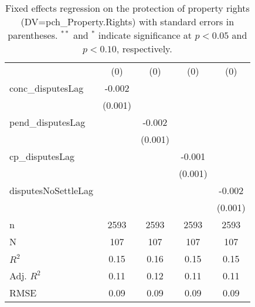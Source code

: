 \begin{table}[ht]
\begin{tabular}{lcccc}
   & (0) & (0) & (0) & (0) \\ 
  conc\_disputesLag & -0.002 &  &  &  \\ 
   & (0.001) &  &  &  \\ 
  pend\_disputesLag &  & -0.002 &  &  \\ 
   &  & (0.001) &  &  \\ 
  cp\_disputesLag &  &  & -0.001 &  \\ 
   &  &  & (0.001) &  \\ 
  disputesNoSettleLag &  &  &  & -0.002 \\ 
   &  &  &  & (0.001) \\ 
   \hline
n & 2593 & 2593 & 2593 & 2593 \\ 
  N & 107 & 107 & 107 & 107 \\ 
  $R^{2}$ & 0.15 & 0.16 & 0.15 & 0.15 \\ 
  Adj. $R^{2}$ & 0.11 & 0.12 & 0.11 & 0.11 \\ 
  RMSE & 0.09 & 0.09 & 0.09 & 0.09 \\ 
   \hline
\hline
\end{tabular}
\caption{Fixed effects regression on the protection of property rights (DV=pch\_Property.Rights) with standard errors in parentheses. $^{**}$ and $^{*}$ indicate significance at $p< 0.05 $ and $p< 0.10 $, respectively.} 
\end{table}
